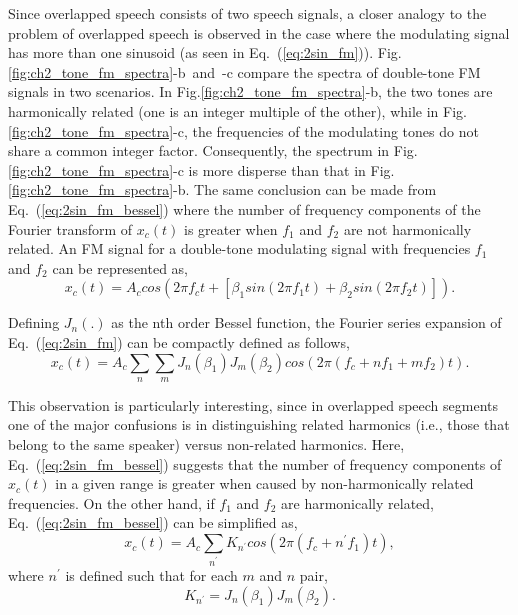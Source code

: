 {Since overlapped speech consists of two speech signals, a closer analogy to the problem of overlapped speech is observed in the case where the modulating signal has more than one sinusoid (as seen in Eq.~(\ref{eq:2sin_fm})). 
Fig.\ref{fig:ch2_tone_fm_spectra}-b~and~-c compare the spectra of double-tone FM signals in two scenarios. 
In Fig.\ref{fig:ch2_tone_fm_spectra}-b, the two tones are harmonically related (one is an integer multiple of the other), while in Fig.\ref{fig:ch2_tone_fm_spectra}-c, the frequencies of the modulating tones do not share a common integer factor. 
Consequently, the spectrum in Fig. \ref{fig:ch2_tone_fm_spectra}-c is more disperse than that in Fig.\ref{fig:ch2_tone_fm_spectra}-b. 
The same conclusion can be made from Eq.~(\ref{eq:2sin_fm_bessel}) where the number of frequency components of the Fourier transform of $x_c(t)$ is greater when $f_1$ and $f_2$ are not harmonically related. 
An FM signal for a double-tone modulating signal with frequencies $f_1$ and $f_2$ can be represented as,
\begin{equation}
\label{eq:2sin_fm}
x_c(t) = A_ccos(2\pi f_ct+[\beta_1 sin(2\pi f_1t) + \beta_2 sin(2\pi f_2t)]).
\end{equation}

Defining $J_n(.)$ as the nth order Bessel function, the Fourier series expansion of Eq.~(\ref{eq:2sin_fm}) can be compactly defined as follows, 
\begin{equation}
\label{eq:2sin_fm_bessel}
x_c(t) = A_c\sum\limits_n\sum\limits_m J_n(\beta_1)J_m(\beta_2)cos(2\pi (f_c+nf_1+mf_2)t).
\end{equation}

This observation is particularly interesting, since in overlapped speech segments one of the major confusions is in distinguishing related harmonics (i.e., those that belong to the same speaker) versus non-related harmonics. 
Here, Eq.~(\ref{eq:2sin_fm_bessel}) suggests that the number of frequency components of $x_c(t)$ in a given range is greater when caused by non-harmonically related frequencies. 
On the other hand, if $f_1$ and $f_2$ are harmonically related, Eq.~(\ref{eq:2sin_fm_bessel}) can be simplified as, 
\begin{equation}
\label{eq:2sin_fm_bessel_simplified}
x_c(t) = A_c\sum\limits_{n^\prime} K_{n^\prime}cos(2\pi (f_c + n^\prime f_1)t),
\end{equation}
where $n^\prime$ is defined such that for each $m$ and $n$ pair,
\begin{equation}
\label{eq:knprime}
K_{n^\prime} = J_n(\beta_1)J_m(\beta_2). 
\end{equation}


}
